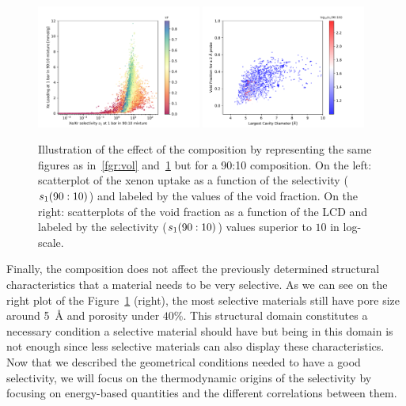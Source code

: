 \documentclass[main.tex]{subfiles}
\begin{document}
\begin{figure}[h!]
  \centering
  \includegraphics[width=0.48\textwidth]{figures/2-thermo/Scatterplot_uptake_selectivity_vol_9010.pdf}  
  \includegraphics[width=0.48\textwidth]{figures/2-thermo/Scatterplot_vf_lcd_selectivity9010.pdf}
  \caption{Illustration of the effect of the composition by representing the same figures as in~\ref{fgr:vol} and~\ref{fgr:compo} but for a 90:10 composition. On the left: scatterplot of the xenon uptake as a function of the selectivity ($s_{\text{1}}(90:10)$) and labeled by the values of the void fraction. On the right: scatterplots of the void fraction as a function of the LCD and labeled by the selectivity ($s_{\text{1}}(90:10)$) values superior to $10$ in log-scale.}\label{fgr:compo}
\end{figure}

Finally, the composition does not affect the previously determined structural characteristics that a material needs to be very selective. As we can see on the right plot of the Figure~\ref{fgr:compo} (right), the most selective materials still have pore size around \SI{5}{\angstrom} and porosity under {$40$\%}. This structural domain constitutes a necessary condition a selective material should have but being in this domain is not enough since less selective materials can also display these characteristics. Now that we described the geometrical conditions needed to have a good selectivity, we will focus on the thermodynamic origins of the selectivity by focusing on energy-based quantities and the different correlations between them.
\end{document}
